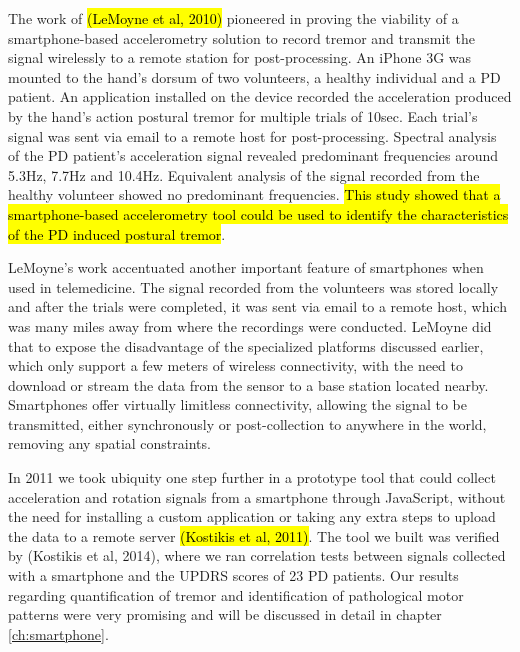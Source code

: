 The work of \hl{(LeMoyne et al, 2010)} pioneered in proving the viability of a smartphone-based accelerometry solution to record tremor and transmit the signal wirelessly to a remote station for post-processing. An iPhone 3G was mounted to the hand's dorsum of two volunteers, a healthy individual and a \gls{PD} patient. An application installed on the device recorded the acceleration produced by the hand's action postural tremor for multiple trials of 10sec. Each trial's signal was sent via email to a remote host for post-processing. Spectral analysis of the \gls{PD} patient's acceleration signal revealed predominant frequencies around 5.3Hz, 7.7Hz and 10.4Hz. Equivalent analysis of the signal recorded from the healthy volunteer showed no predominant frequencies. \hl{This study showed that a smartphone-based accelerometry tool could be used to identify the characteristics of the PD induced postural tremor}. 

LeMoyne's work accentuated another important feature of smartphones when used in telemedicine. The signal recorded from the volunteers was stored locally and after the trials were completed, it was sent via email to a remote host, which was many miles away from where the recordings were conducted. LeMoyne did that to expose the disadvantage of the specialized platforms discussed earlier, which only support a few meters of wireless connectivity, with the need to download or stream the data from the sensor to a base station located nearby. Smartphones offer virtually limitless connectivity, allowing the signal to be transmitted, either synchronously or post-collection to anywhere in the world, removing any spatial constraints. 

In 2011 we took ubiquity one step further in a prototype tool that could collect acceleration and rotation signals from a smartphone through JavaScript, without the need for installing a custom application or taking any extra steps to upload the data to a remote server \hl{(Kostikis et al, 2011)}. The tool we built was verified by (Kostikis et al, 2014), where we ran correlation tests between signals collected with a smartphone and the \gls{UPDRS} scores of 23 \gls{PD} patients. Our results regarding quantification of tremor and identification of pathological motor patterns were very promising and will be discussed in detail in chapter \ref{ch:smartphone}. 

